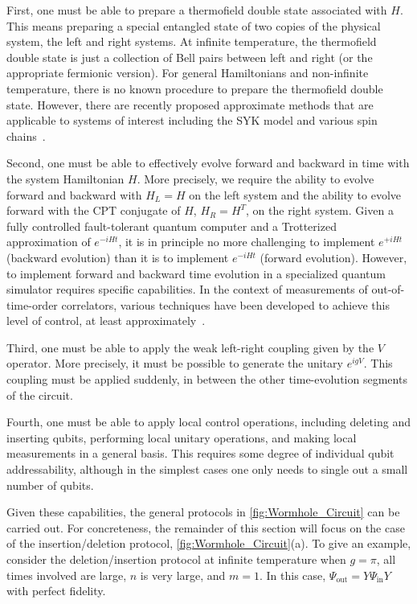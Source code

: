 \documentclass[aps,pra,reprint,floatfix,superscriptaddress, nofootinbib,longbibliography,onecolumn,notitlepage,12pt, tightenlines]{revtex4-1}
\begin{document}
First, one must be able to prepare a thermofield double state associated with $H$. This means preparing a special entangled state of two copies of the physical system, the left and right systems. At infinite temperature, the thermofield double state is just a collection of Bell pairs between left and right (or the appropriate fermionic version). For general Hamiltonians and non-infinite temperature, there is no known procedure to prepare the thermofield double state. However, there are recently proposed approximate methods that are applicable to systems of interest including the SYK model and various spin chains~\cite{Martyn_2019,Cottrell_2019,wu2018variational}.

Second, one must be able to effectively evolve forward and backward in time with the system Hamiltonian $H$. More precisely, we require the ability to evolve forward and backward with $H_L = H$ on the left system and the ability to evolve forward with the CPT conjugate of $H$, $H_R = H^T$, on the right system. Given a fully controlled fault-tolerant quantum computer and a Trotterized approximation of $e^{-i H t}$, it is in principle no more challenging to implement $e^{+ i H t}$ (backward evolution) than it is to implement $e^{-i H t}$ (forward evolution). However, to implement forward and backward time evolution in a specialized quantum simulator requires specific capabilities. In the context of measurements of out-of-time-order correlators, various techniques have been developed to achieve this level of control, at least approximately~\cite{Swingle:2016var,Yao2016a,Zhu2016,Campisi2017,Halpern2016,Yoshida2018,Li2017a,Garttner2016,Meier2017,Landsman_2019}.

Third, one must be able to apply the weak left-right coupling given by the $V$ operator. More precisely, it must be possible to generate the unitary $e^{i g V}$. This coupling must be applied suddenly, in between the other time-evolution segments of the circuit.

Fourth, one must be able to apply local control operations, including deleting and inserting qubits, performing local unitary operations, and making local measurements in a general basis. This requires some degree of individual qubit addressability, although in the simplest cases one only needs to single out a small number of qubits.

Given these capabilities, the general protocols in \cref{fig:Wormhole_Circuit} can be carried out. For concreteness, the remainder of this section will focus on the case of the insertion/deletion protocol, \cref{fig:Wormhole_Circuit}(a).
To give an example, consider the deletion/insertion protocol at infinite temperature when $g=\pi$, all times involved are large, $n$ is very large, and $m=1$. In this case,  $\Psi_{\text{out}} = Y \Psi_{\text{in}} Y$ with perfect fidelity.
\end{document}
